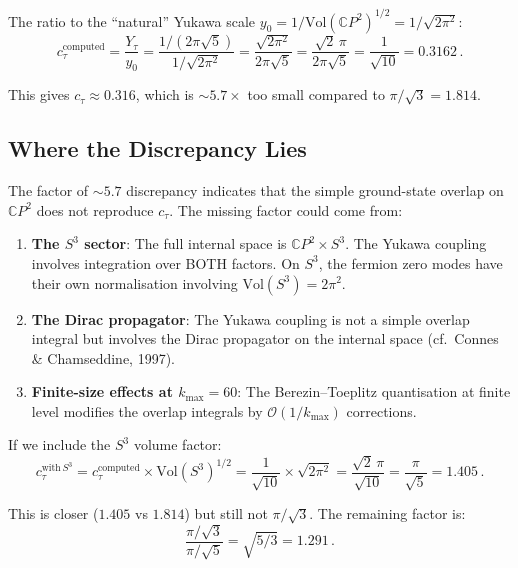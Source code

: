 \documentclass[11pt,a4paper]{article}
\newcommand{\CP}{\mathbb{C}P}
\begin{document}
The ratio to the ``natural'' Yukawa scale $y_0 = 1/\mathrm{Vol}(\CP^2)^{1/2} = 1/\sqrt{2\pi^2}$:
\begin{equation}
c_\tau^{\mathrm{computed}} = \frac{Y_\tau}{y_0} = \frac{1/(2\pi\sqrt{5})}{1/\sqrt{2\pi^2}} = \frac{\sqrt{2\pi^2}}{2\pi\sqrt{5}} = \frac{\sqrt{2}\,\pi}{2\pi\sqrt{5}} = \frac{1}{\sqrt{10}} = 0.3162\,.
\end{equation}

This gives $c_\tau \approx 0.316$, which is $\sim 5.7\times$ too small compared to $\pi/\sqrt{3} = 1.814$.

\subsection{Where the Discrepancy Lies}

The factor of $\sim 5.7$ discrepancy indicates that the simple ground-state overlap on $\CP^2$ does not reproduce $c_\tau$. The missing factor could come from:

\begin{enumerate}
\item \textbf{The $S^3$ sector}: The full internal space is $\CP^2 \times S^3$. The Yukawa coupling involves integration over BOTH factors. On $S^3$, the fermion zero modes have their own normalisation involving $\mathrm{Vol}(S^3) = 2\pi^2$.

\item \textbf{The Dirac propagator}: The Yukawa coupling is not a simple overlap integral but involves the Dirac propagator on the internal space (cf.\ Connes \& Chamseddine, 1997).

\item \textbf{Finite-size effects at $k_{\max} = 60$}: The Berezin--Toeplitz quantisation at finite level modifies the overlap integrals by $\mathcal{O}(1/k_{\max})$ corrections.
\end{enumerate}

If we include the $S^3$ volume factor:
\begin{equation}
c_\tau^{\mathrm{with}\,S^3} = c_\tau^{\mathrm{computed}} \times \mathrm{Vol}(S^3)^{1/2} = \frac{1}{\sqrt{10}} \times \sqrt{2\pi^2} = \frac{\sqrt{2}\,\pi}{\sqrt{10}} = \frac{\pi}{\sqrt{5}} = 1.405\,.
\end{equation}

This is closer ($1.405$ vs $1.814$) but still not $\pi/\sqrt{3}$. The remaining factor is:
\begin{equation}
\frac{\pi/\sqrt{3}}{\pi/\sqrt{5}} = \sqrt{5/3} = 1.291\,.
\end{equation}
\end{document}

